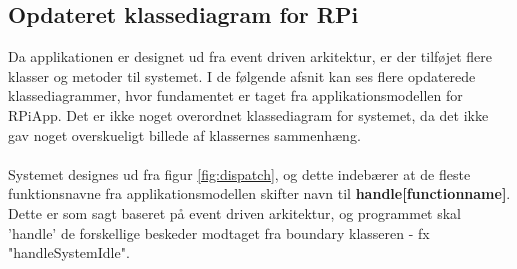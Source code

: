 \documentclass[Softwaredesign/Softwaredesign_main.tex]{subfiles}
\begin{document}
\subsection{Opdateret klassediagram for RPi}
Da applikationen er designet ud fra event driven arkitektur, er der tilføjet flere klasser og metoder til systemet. I de følgende afsnit kan ses flere opdaterede klassediagrammer, hvor fundamentet er taget fra applikationsmodellen for RPiApp. Det er ikke noget overordnet klassediagram for systemet, da det ikke gav noget overskueligt billede af klassernes sammenhæng. \\\\
Systemet designes ud fra figur \ref{fig:dispatch}, og dette indebærer at de fleste funktionsnavne fra applikationsmodellen skifter navn til \textbf{handle[functionname]}. Dette er som sagt baseret på event driven arkitektur, og programmet skal 'handle' de forskellige beskeder modtaget fra boundary klasseren - fx "handleSystemIdle".  
\end{document}
